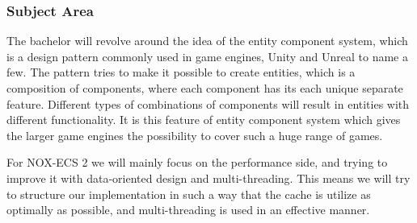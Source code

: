 \subsubsection{Subject Area}
The bachelor will revolve around the idea of the entity component system, which is a design pattern commonly used in game engines, Unity and Unreal to name a few. 
The pattern tries to make it possible to create entities, which is a composition of components, where each component has its each unique separate feature. 
Different types of combinations of components will result in entities with different functionality. 
It is this feature of entity component system which gives the larger game engines the possibility to cover such a huge range of games.
\par For NOX-ECS 2 we will mainly focus on the performance side, and trying to improve it with data-oriented design and multi-threading. 
This means we will try to structure our implementation in such a way that the cache is utilize as optimally as possible, and multi-threading is used in an effective manner.